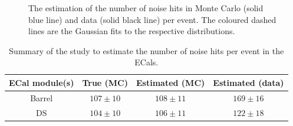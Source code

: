 \begin{figure}%
  \centering
  \caption{The estimation of the number of noise hits in Monte Carlo (solid blue line) and data (solid black line) per event.  The coloured dashed lines are the Gaussian fits to the respective distributions.}
  \label{fig:ECalNoiseMCEstimateDataEstimate}
\end{figure}
\begin{table}
  \begin{tabular}{ c c c c}
  ECal module(s) & True (MC) & Estimated (MC) & Estimated (data)  \\ \hline \hline
  Barrel & $107\pm10$ & $108\pm11$ & $169\pm16$ \\
  DS & $104\pm10$ & $106\pm11$ & $122\pm18$ \\
  \end{tabular}
  \caption{Summary of the study to estimate the number of noise hits per event in the ECals.}
  \label{table:NoiseRateSummary}
\end{table}
